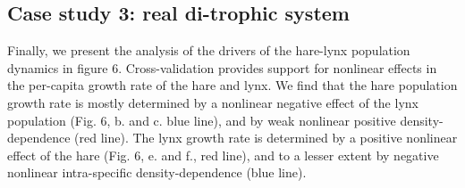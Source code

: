 \documentclass[11pt, oneside]{article}
\begin{document}
\subsection{Case study 3: real di-trophic system}

Finally, we present the analysis of the drivers of the hare-lynx population dynamics in figure 6.
Cross-validation provides support for nonlinear effects in the per-capita growth rate of the hare and lynx.
We find that the hare population growth rate is mostly determined by a nonlinear negative effect of the lynx population (Fig. 6, b. and c. blue line), and by weak nonlinear positive density-dependence (red line). 
The lynx growth rate is determined by a positive nonlinear effect of the hare (Fig. 6, e. and f., red line), and to a lesser extent by negative nonlinear intra-specific density-dependence (blue line).
\end{document}

